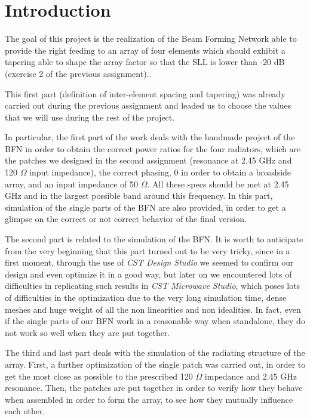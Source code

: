 \section{Introduction}
The goal of this project is the realization of the Beam Forming Network able to provide the right feeding to an array of four elements which should exhibit a tapering able to shape the array factor so that the SLL is lower than -20 dB (exercise 2 of the previous assignment)..

\par\medskip
\noindent
This first part (definition of inter-element spacing and tapering) was already carried out during the previous assignment and leaded us to choose the values that we will use during the rest of the project.

\par\medskip
\noindent
In particular, the first part of the work deals with the handmade project of the BFN in order to obtain the correct power ratios for the four radiators, which are the patches we designed in the second assignment (resonance at 2.45 GHz and 120 $\Omega$ input impedance), the correct phasing, 0 in order to obtain a broadside array, and an input impedance of 50 $\Omega$. All these specs should be met at 2.45 GHz and in the largest possible band around this frequency.
\noindent
In this part, simulation of the single parts of the BFN are also provided, in order to get a glimpse on the correct or not correct behavior of the final version.

\par\medskip
\noindent
The second part is related to the simulation of the BFN. It is worth to anticipate from the very beginning that this part turned out to be very tricky, since in a first moment, through the use of \textit{CST Design Studio} we seemed to confirm our design and even optimize it in a good way, but later on we encountered lots of difficulties in replicating such results in \textit{CST Microwave Studio}, which poses lots of difficulties in the optimization due to the very long simulation time, dense meshes and huge weight of all the non linearities and non idealities. In fact, even if the single parts of our BFN work in a reasonable way when standalone, they do not work so well when they are put together. 

\par\medskip
\noindent
The third and last part deals with the simulation of the radiating structure of the array. First, a further optimization of the single patch was carried out, in order to get the most close as possible to the prescribed 120 $\Omega$ impedance and 2.45 GHz resonance. Then, the patches are put together in order to verify how they behave when assembled in order to form the array, to see how they mutually influence each other.